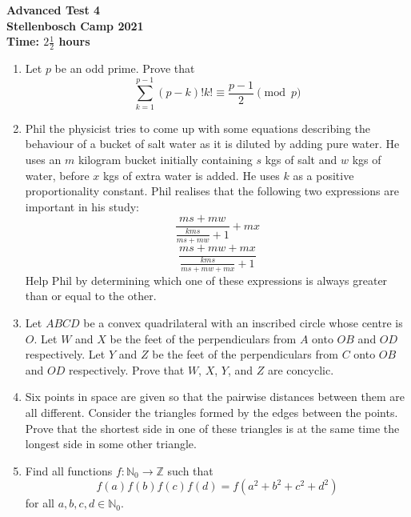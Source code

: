 \documentclass{article}
\begin{document}
\thispagestyle{empty}

\begin{center}
  \textbf{\Large Advanced Test 4}
  \\ \vspace{1em}
  \textbf{\large Stellenbosch Camp 2021}
  \\ \vspace{1em}
  \textbf{\large Time: $2\frac{1}{2}$ hours}
\end{center}

\bigskip

\begin{enumerate}[itemsep=\fill]

\item %
Let $p$ be an odd prime. Prove that
\[
	\sum_{k=1}^{p-1} (p-k)!k! \equiv \frac{p-1}{2} \pmod{p}
\]


\item %
Phil the physicist tries to come up with some equations describing the behaviour of a bucket of salt water as it is diluted by adding pure water. He uses an $m$ kilogram bucket initially containing $s$ kgs of salt and $w$ kgs of water, before $x$ kgs of extra water is added. He uses $k$ as a positive proportionality constant. Phil realises that the following two expressions are important in his study: 
$$\frac{ms+mw}{\frac{kms}{ms+mw}+1} + mx$$
$$\frac{ms+mw+mx}{\frac{kms}{ms+mw+mx}+1}$$
Help Phil by determining which one of these expressions is always greater than or equal to the other.

\item %
Let $ABCD$ be a convex quadrilateral with an inscribed circle whose centre is $O$. Let $W$ and $X$ be the feet of the perpendiculars from $A$ onto $OB$ and $OD$ respectively. Let $Y$ and $Z$ be the feet of the perpendiculars from $C$ onto $OB$ and $OD$ respectively. Prove that $W$, $X$, $Y$, and $Z$ are concyclic.


\item %
Six points in space are given so that the pairwise distances between them are all different. Consider the triangles formed by the edges between the points. Prove that the shortest side in one of these triangles is at the same time the longest side in some other triangle.


\item %
Find all functions $f : \mathbb{N}_0 \to \mathbb{Z}$ such that
\[
  f(a) f(b) f(c) f(d) = f\left(a^2 + b^2 + c^2 + d^2\right)
\]
for all $a, b, c, d \in \mathbb{N}_0$.

\end{enumerate}
\end{document}
